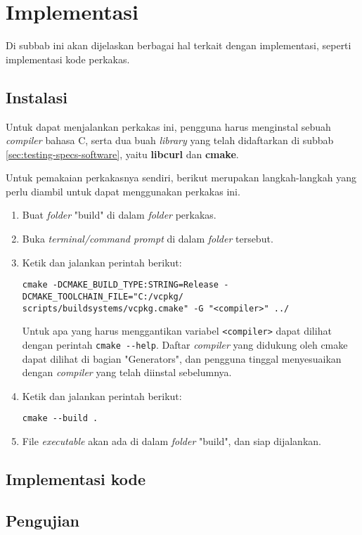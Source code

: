 \section{Implementasi}
\label{sec:testing-implementation}

Di subbab ini akan dijelaskan berbagai hal terkait dengan implementasi, seperti implementasi kode perkakas. 

\subsection{Instalasi}
\label{sec:testing-implementation-installation}

Untuk dapat menjalankan perkakas ini, pengguna harus menginstal sebuah \textit{compiler} bahasa C, serta dua buah \textit{library} yang telah didaftarkan di subbab \ref{sec:testing-specs-software}, yaitu \textbf{libcurl} dan \textbf{cmake}.

Untuk pemakaian perkakasnya sendiri, berikut merupakan langkah-langkah yang perlu diambil untuk dapat menggunakan perkakas \cl ini.

\begin{enumerate}
	\item Buat \textit{folder} "build" di dalam \textit{folder} perkakas.
	\item Buka \textit{terminal/command prompt} di dalam \textit{folder} tersebut.
	\item Ketik dan jalankan perintah berikut:
	\begin{verbatim}
cmake -DCMAKE_BUILD_TYPE:STRING=Release -DCMAKE_TOOLCHAIN_FILE="C:/vcpkg/
scripts/buildsystems/vcpkg.cmake" -G "<compiler>" ../
	\end{verbatim}
	Untuk apa yang harus menggantikan variabel \verb|<compiler>| dapat dilihat dengan perintah \verb|cmake --help|. Daftar \textit{compiler} yang didukung oleh cmake dapat dilihat di bagian \mbox{"Generators"}, dan pengguna tinggal menyesuaikan dengan \textit{compiler} yang telah diinstal sebelumnya.
	\item Ketik dan jalankan perintah berikut:
	\begin{verbatim}
cmake --build .
	\end{verbatim}
	\item File \textit{executable} akan ada di dalam \textit{folder} "build", dan siap dijalankan.
\end{enumerate}

\subsection{Implementasi kode}
\label{sec:testing-implementation-code}

\subsection{Pengujian}
\label{sec:testing-experiments}
